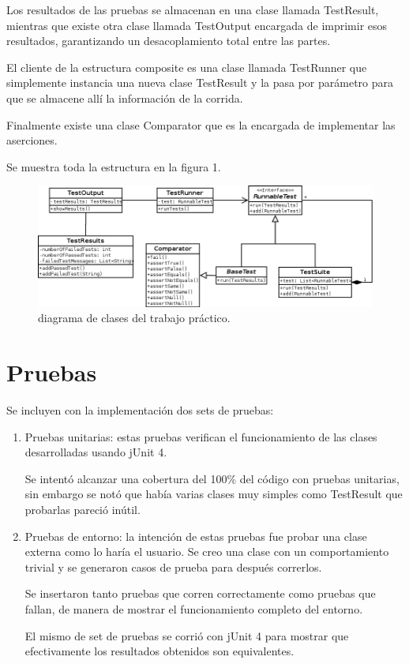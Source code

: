 \documentclass[12pt]{article}
\begin{document}
Los resultados de las pruebas se almacenan en una clase llamada TestResult,
mientras que existe otra clase llamada TestOutput encargada de imprimir esos
resultados, garantizando un desacoplamiento total entre las partes.

El cliente de la estructura composite es una clase llamada TestRunner que
simplemente instancia una nueva clase TestResult y la pasa por parámetro para 
que se almacene allí la información de la corrida.

Finalmente existe una clase Comparator que es la encargada de implementar las 
aserciones.

Se muestra toda la estructura en la figura 1.

\begin{figure}[h]
\begin{center}
	\includegraphics[scale=0.50,angle=90]{./ClassDiagram}
\end{center}
	\caption{diagrama de clases del trabajo práctico.}
\end{figure}

\section{Pruebas}
Se incluyen con la implementación dos sets de pruebas:

	\begin{enumerate}
	
	\item Pruebas unitarias: estas pruebas verifican el funcionamiento de 
	las clases desarrolladas usando jUnit 4. 
	
	Se intentó alcanzar una cobertura del 100\% del código con pruebas 
	unitarias, sin embargo se notó que había varias clases muy simples como 
	TestResult que probarlas pareció inútil.

	\item Pruebas de entorno: la intención de estas pruebas fue probar una 
	clase externa como lo haría el usuario.
	Se creo una clase con un comportamiento trivial y se generaron casos de
	prueba para después correrlos. 
	
	Se insertaron tanto pruebas que corren correctamente como pruebas que
	fallan, de manera de mostrar el funcionamiento completo del entorno.
	
	El mismo de set de pruebas se corrió con jUnit 4 para mostrar que 
	efectivamente los resultados obtenidos son equivalentes.
	\end{enumerate}
\end{document}
